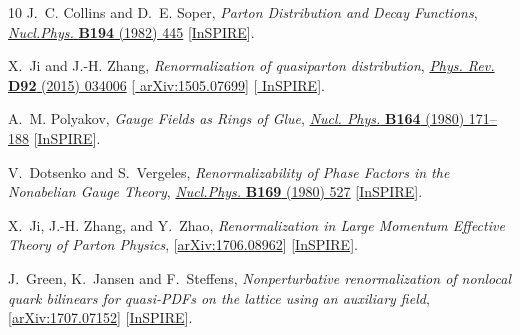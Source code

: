 \begin{thebibliography}{10}
J.~C. Collins and D.~E. Soper, {\it {Parton Distribution and Decay Functions}},
\href{http://dx.doi.org/10.1016/0550-3213(82)90021-9}{{\em Nucl.Phys.}
  {\bfseries B194} (1982) 445}
  [\href{http://inspirehep.net/record/166064}{{\ttfamily InSPIRE}}].

X.~Ji and J.-H. Zhang, {\it {Renormalization of quasiparton distribution}},
\href{http://dx.doi.org/10.1103/PhysRevD.92.034006}{{\em Phys. Rev.} {\bfseries
  D92} (2015) 034006} [\href{http://arxiv.org/abs/1505.07699}{{\ttfamily
  arXiv:1505.07699}}] [\href{http://inspirehep.net/record/1373537}{{\ttfamily
  InSPIRE}}].

A.~M. Polyakov, {\it {Gauge Fields as Rings of Glue}},
\href{http://dx.doi.org/10.1016/0550-3213(80)90507-6}{{\em Nucl. Phys.}
  {\bfseries B164} (1980) 171--188}
  [\href{http://inspirehep.net/record/157352}{{\ttfamily InSPIRE}}].

V.~Dotsenko and S.~Vergeles, {\it {Renormalizability of Phase Factors in the
  Nonabelian Gauge Theory}},
\href{http://dx.doi.org/10.1016/0550-3213(80)90103-0}{{\em Nucl.Phys.}
  {\bfseries B169} (1980) 527}
  [\href{http://inspirehep.net/record/144525}{{\ttfamily InSPIRE}}].

X.~Ji, J.-H. Zhang, and Y.~Zhao,
{\it {Renormalization in Large Momentum Effective Theory of Parton Physics}},
  [\href{http://arxiv.org/abs/1706.08962}{{\ttfamily arXiv:1706.08962}}]
  [\href{http://inspirehep.net/record/1607797}{{\ttfamily InSPIRE}}].


  J.~Green, K.~Jansen and F.~Steffens,
  {\it {Nonperturbative renormalization of nonlocal quark bilinears for quasi-PDFs on the lattice using an auxiliary field}},
    [\href{http://arxiv.org/abs/1707.07152}{{\ttfamily arXiv:1707.07152}}]
  [\href{http://inspirehep.net/record/1611305}{{\ttfamily InSPIRE}}].

\end{thebibliography}\endgroup
